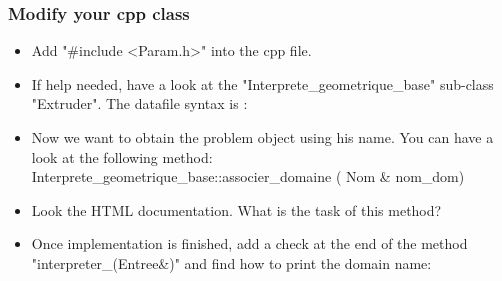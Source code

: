 \documentclass[10pt, hyperref={unicode=true,pdfusetitle, bookmarks=true,bookmarksnumbered=false,bookmarksopen=false, breaklinks=false,pdfborder={0 0 1},backref=true,colorlinks=true,linkcolor=darkblue,pageanchor, urlcolor=darkblue}]{beamer}
\begin{document}
\begin{frame}
\frametitle{Modify your cpp class}
\begin{block}{}

\begin{itemize}
\item Add "\#include <Param.h>" into the cpp file.

\item If help needed, have a look at the "Interprete\_geometrique\_base" sub-class "Extruder". The datafile syntax is :
\begin{center}
\end{center}

\item Now we want to obtain the problem object using his name. You can have a look at the following method: \\
Interprete\_geometrique\_base::associer\_domaine ( Nom \& nom\_dom)

\item Look the HTML documentation. What is the task of this method?

\item Once implementation is finished, add a check at the end of the method
"interpreter\_(Entree\&)" and find how to print the domain name:
\begin{center}
\end{center}
\end{itemize}

\end{block}
\end{frame}
\end{document}

